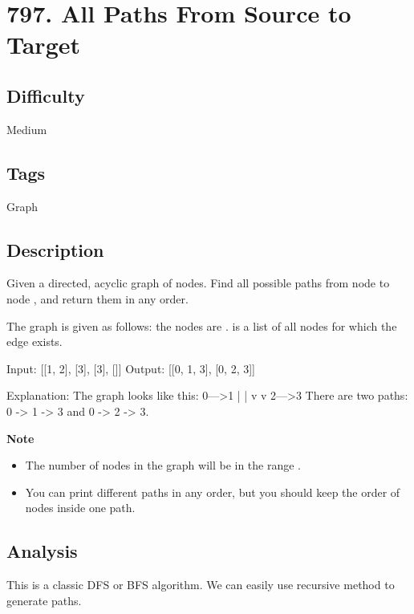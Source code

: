 \tocless\section{797. All Paths From Source to Target}
\label{algo:797}

\subsection*{Difficulty}
Medium

\subsection*{Tags}
Graph

\subsection*{Description}
Given a directed, acyclic graph of  nodes.  Find all possible paths from node  to node , and return them in any order.

The graph is given as follows:  the nodes are .   is a list of all nodes  for which the edge  exists.

\begin{example}
\begin{multilinecode}
Input: [[1, 2], [3], [3], []]
Output: [[0, 1, 3], [0, 2, 3]]

Explanation: The graph looks like this:
0--->1
|    |
v    v
2--->3
There are two paths: 0 -> 1 -> 3 and 0 -> 2 -> 3.
\end{multilinecode}
\end{example}

\textbf{Note}
\begin{itemize}
    \item The number of nodes in the graph will be in the range \inlinecode{[2, 15]}.
    \item You can print different paths in any order, but you should keep the order of nodes inside one path.
\end{itemize}

\subsection*{Analysis}
This is a classic DFS or BFS algorithm. We can easily use recursive method to generate paths.

